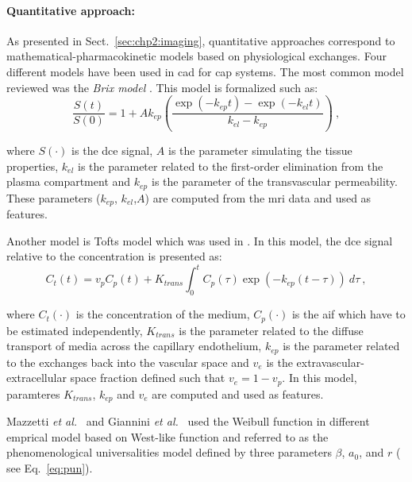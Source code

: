 \paragraph{Quantitative approach:}
As presented in Sect.~\ref{sec:chp2:imaging}, quantitative approaches correspond to mathematical-pharmacokinetic models based on physiological exchanges.
Four different models have been used in \ac{cad} for \ac{cap} systems.
The most common model reviewed was the \textit{Brix model} \cite{Artan2009,Artan2010,Sung2011,Liu2009,Ozer2009,Ozer2010}.
This model is formalized such as:
\begin{equation}
	\frac{S(t)}{S(0)} = 1 + A k_{ep} \left( \frac{\exp( -k_{ep} t ) - \exp( -k_{el} t )}{k_{el} - k_{ep}} \right) \ ,
	\label{eq:brixmod}
\end{equation}

\noindent where $S(\cdot)$ is the \ac{dce} signal, $A$ is the parameter simulating the tissue properties, $k_{el}$ is the parameter related to the first-order elimination from the plasma compartment and $k_{ep}$ is the parameter of the transvascular permeability.
These parameters ($k_{ep}$, $k_{el}$,$A$) are computed from the \ac{mri} data and used as features.

Another model is Tofts model \cite{Tofts1997} which was used in \cite{Langer2009,Giannini2013,Niaf2011,Niaf2012,Mazzetti2011}.
In this model, the \ac{dce} signal relative to the concentration is presented as:
\begin{equation}
	C_t(t) = v_p C_p(t) + K_{trans} \int_{0}^{t} C_p(\tau) \exp( -k_{ep}(t-\tau) ) \ d\tau \ ,
	\label{eq:tofts} 
\end{equation}

\noindent where $C_t(\cdot)$ is the concentration of the medium, $C_p(\cdot)$ is the \ac{aif} which have to be estimated independently, $K_{trans}$ is the parameter related to the diffuse transport of media across the capillary endothelium, $k_{ep}$ is the parameter related to the exchanges back into the vascular space and $v_e$ is the extravascular-extracellular space fraction defined such that $v_e = 1 - v_p$.
In this model, paramteres $K_{trans}$, $k_{ep}$ and $v_e$ are computed and used as features.

Mazzetti \textit{et al.}~\cite{Mazzetti2011} and Giannini \textit{et al.}~\cite{Giannini2013} used the Weibull function in different emprical model based on West-like function and referred to as the phenomenological universalities model \cite{Castorina2006} defined by three parameters $\beta$, $a_{0}$, and $r$ ( see Eq.~\ref{eq:pun}).


